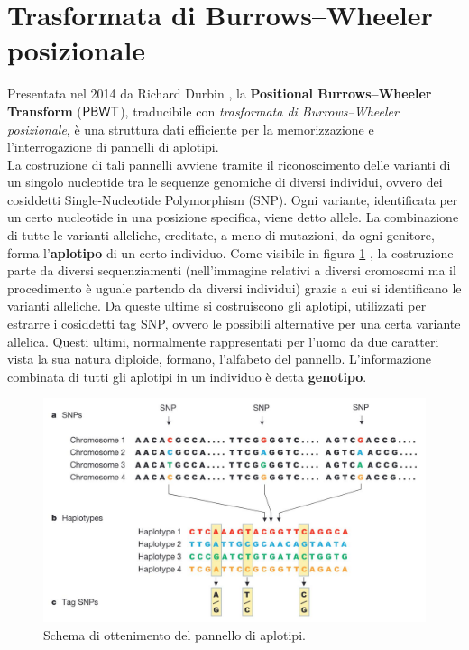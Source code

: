 \section{Trasformata di Burrows--Wheeler posizionale}
\label{secpbwt}
Presentata nel 2014 da Richard Durbin \cite{pbwt}, la \textbf{Positional
  Burrows--Wheeler Transform} ($\mbox{\rm {\sf PBWT}}$), traducibile con
\textit{trasformata di Burrows--Wheeler posizionale}, è una struttura dati
efficiente
per la memorizzazione e l'interrogazione di pannelli di aplotipi.\\
La costruzione di tali pannelli avviene tramite il riconoscimento delle
varianti di un singolo nucleotide tra le sequenze genomiche di diversi
individui, ovvero dei cosiddetti Single-Nucleotide Polymorphism
(SNP). Ogni variante, identificata per un certo nucleotide in una
posizione specifica, viene 
detto allele. La combinazione di tutte le varianti alleliche,
ereditate, a meno di mutazioni, da ogni genitore, forma l'\textbf{aplotipo} di
un certo individuo. Come visibile in figura \ref{fig:haplo} \cite{haplo}, la 
costruzione parte da diversi sequenziamenti (nell'immagine relativi a diversi
cromosomi ma il
procedimento è uguale partendo da diversi individui) grazie a cui si
identificano le 
varianti alleliche. Da queste ultime si costruiscono gli aplotipi, utilizzati
per estrarre i cosiddetti tag SNP, ovvero le possibili alternative per
una certa variante allelica. Questi ultimi, normalmente rappresentati per
l'uomo da due caratteri vista la sua natura diploide, formano,
l'alfabeto del pannello. 
L’informazione combinata di tutti gli aplotipi in un individuo è detta
\textbf{genotipo}.
\begin{figure}
  \centering
  \includegraphics[scale = 0.25]{img/haplo.jpg}
  \caption{Schema di ottenimento del pannello di aplotipi.}
  \label{fig:haplo}
\end{figure}
